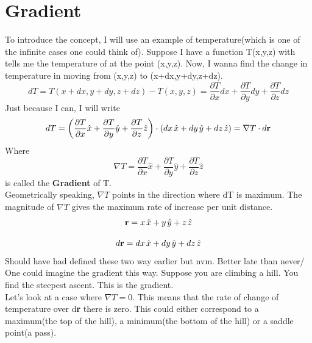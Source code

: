\documentclass[12pt]{article}
\begin{document}
\section{Gradient}
To introduce the concept, I will use an example of temperature(which is one of the infinite cases one could think of).
Suppose I have a function T(x,y,z) with tells me the temperature of at the point (x,y,z). Now, I wanna find the change in temperature in moving from
(x,y,z) to (x+dx,y+dy,z+dz). 
\begin{equation}
    dT=T(x+dx,y+dy,z+dz)-T(x,y,z)=\frac{\partial T}{\partial x}dx + \frac{\partial T}{\partial y}dy + \frac{\partial T}{\partial z}dz
\end{equation}
Just because I can, I will write
\begin{align}
    dT = \left(\frac{\partial T}{\partial x}\hat{x} + \frac{\partial T}{\partial y}\hat{y} + \frac{\partial T}{\partial z}\hat{z}\right)\cdot(dx\hspace{0.05cm}\hat{x}+dy\hspace{0.05cm}\hat{y}+dz\hspace{0.05cm}\hat{z})= \nabla T \cdot d\mathbf{r}
\end{align}
Where
\begin{equation}
    \nabla T = \frac{\partial T}{\partial x}\hat{x} + \frac{\partial T}{\partial y}\hat{y} + \frac{\partial T}{\partial z}\hat{z}
\end{equation}
is called the \textbf{Gradient} of T. \\
Geometrically speaking, $\nabla T$ points in the direction where dT is maximum. The magnitude of $\nabla T$ gives the maximum rate of increase per unit distance.
\begin{equation}
    \mathbf{r}=x\hspace{0.05cm}\hat{x}+y\hspace{0.05cm}\hat{y}+z\hspace{0.05cm}\hat{z} \notag 
\end{equation}

\begin{equation}
    d\mathbf{r}=dx\hspace{0.05cm}\hat{x}+dy\hspace{0.05cm}\hat{y}+dz\hspace{0.05cm}\hat{z} \notag
\end{equation}
Should have had defined these two way earlier but nvm. Better late than never/ \\
One could imagine the gradient this way. Suppose you are climbing a hill. You find the steepest ascent. This is the gradient. \\
Let's look at a case where $\nabla T = 0$. This means that the rate of change of temperature over d\textbf{r} there is zero. This could either correspond to a maximum(the top of the hill), a minimum(the bottom of the hill) or a saddle point(a pass).
\end{document}

